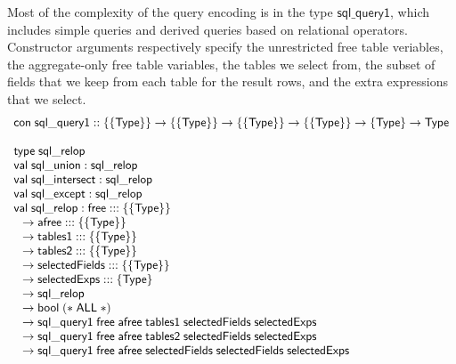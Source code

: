 \documentclass{article}
\newcommand{\mt}[1]{\mathsf{#1}}
\begin{document}
Most of the complexity of the query encoding is in the type $\mt{sql\_query1}$, which includes simple queries and derived queries based on relational operators.  Constructor arguments respectively specify the unrestricted free table veriables, the aggregate-only free table variables, the tables we select from, the subset of fields that we keep from each table for the result rows, and the extra expressions that we select.
$$\begin{array}{l}
  \mt{con} \; \mt{sql\_query1} :: \{\{\mt{Type}\}\} \to \{\{\mt{Type}\}\} \to \{\{\mt{Type}\}\} \to \{\{\mt{Type}\}\} \to \{\mt{Type}\} \to \mt{Type} \\
  \\
  \mt{type} \; \mt{sql\_relop} \\
  \mt{val} \; \mt{sql\_union} : \mt{sql\_relop} \\
  \mt{val} \; \mt{sql\_intersect} : \mt{sql\_relop} \\
  \mt{val} \; \mt{sql\_except} : \mt{sql\_relop} \\
  \mt{val} \; \mt{sql\_relop} : \mt{free} ::: \{\{\mt{Type}\}\} \\
  \hspace{.1in} \to \mt{afree} ::: \{\{\mt{Type}\}\} \\
  \hspace{.1in} \to \mt{tables1} ::: \{\{\mt{Type}\}\} \\
  \hspace{.1in} \to \mt{tables2} ::: \{\{\mt{Type}\}\} \\
  \hspace{.1in} \to \mt{selectedFields} ::: \{\{\mt{Type}\}\} \\
  \hspace{.1in} \to \mt{selectedExps} ::: \{\mt{Type}\} \\
  \hspace{.1in} \to \mt{sql\_relop} \\
  \hspace{.1in} \to \mt{bool} \; (* \; \mt{ALL} \; *) \\
  \hspace{.1in} \to \mt{sql\_query1} \; \mt{free} \; \mt{afree} \; \mt{tables1} \; \mt{selectedFields} \; \mt{selectedExps} \\
  \hspace{.1in} \to \mt{sql\_query1} \; \mt{free} \; \mt{afree} \; \mt{tables2} \; \mt{selectedFields} \; \mt{selectedExps} \\
  \hspace{.1in} \to \mt{sql\_query1} \; \mt{free} \; \mt{afree} \; \mt{selectedFields} \; \mt{selectedFields} \; \mt{selectedExps}
\end{array}$$
\end{document}
